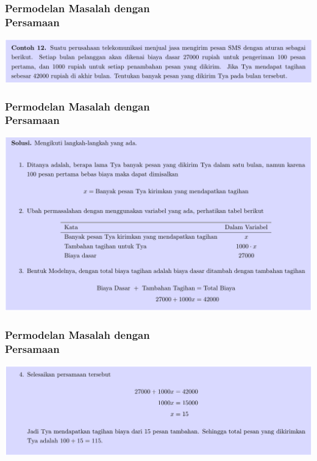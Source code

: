 \documentclass[pdflatex,compress,mathserif]{beamer}
\begin{document}
\begin{frame}
	\frametitle{Permodelan Masalah dengan\\Persamaan}
	\begin{center}
		\includegraphics[width=\linewidth]{img/img27}
	\end{center}
\end{frame}

\begin{frame}
	\frametitle{Permodelan Masalah dengan\\Persamaan}
	\begin{center}
		\includegraphics[width=\linewidth]{img/img28}
	\end{center}
\end{frame}

\begin{frame}
	\frametitle{Permodelan Masalah dengan\\Persamaan}
	\begin{center}
		\includegraphics[width=\linewidth]{img/img29}
	\end{center}
\end{frame}
\end{document}
